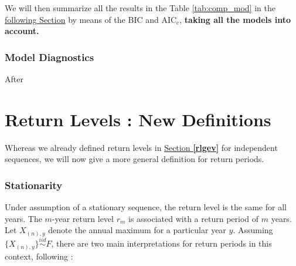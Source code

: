 We will then summarize all the results in the Table \ref{tab:comp_mod} in the \hyperref[sec:nnxp]{following Section} by means of the BIC and $\text{AIC}_{\text{c}}$, \textbf{taking all the models into account.}



\subsubsection*{Model Diagnostics}

After




\section{Return Levels : New Definitions}\label{sec:returnlvlnstatio}

Whereas we already defined return levels in \hyperref[rlgev]{Section  \textbf{\ref{rlgev}}} for independent sequences, we will now give a more general definition for return periods. 

\subsubsection*{Stationarity} 
Under assumption of a
stationary sequence, the return level is the same for all years. The $m$-year return level $r_m$ is associated with a return period of $m$ years. Let $X_{(n),y}$ denote the annual maximum for a particular year $y$. Assuming $\{X_{(n),y}\}\stackrel{iid}{\sim}F$, there are two main interpretations for return periods in this context, following \citet[chap.4]{ag_extremes_2013} :

